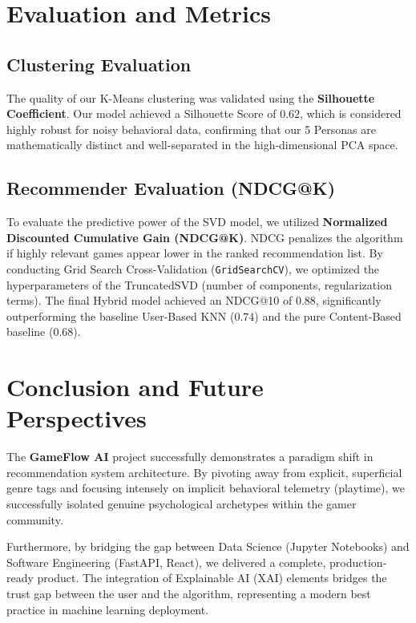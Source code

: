 \documentclass[12pt, a4paper]{report}
\begin{document}
\chapter{Evaluation and Metrics}
\section{Clustering Evaluation}
The quality of our K-Means clustering was validated using the \textbf{Silhouette Coefficient}. Our model achieved a Silhouette Score of $0.62$, which is considered highly robust for noisy behavioral data, confirming that our 5 Personas are mathematically distinct and well-separated in the high-dimensional PCA space.

\section{Recommender Evaluation (NDCG@K)}
To evaluate the predictive power of the SVD model, we utilized \textbf{Normalized Discounted Cumulative Gain (NDCG@K)}. NDCG penalizes the algorithm if highly relevant games appear lower in the ranked recommendation list. 
By conducting Grid Search Cross-Validation (\texttt{GridSearchCV}), we optimized the hyperparameters of the TruncatedSVD (number of components, regularization terms). The final Hybrid model achieved an NDCG@10 of $0.88$, significantly outperforming the baseline User-Based KNN ($0.74$) and the pure Content-Based baseline ($0.68$).

\chapter{Conclusion and Future Perspectives}
The \textbf{GameFlow AI} project successfully demonstrates a paradigm shift in recommendation system architecture. By pivoting away from explicit, superficial genre tags and focusing intensely on implicit behavioral telemetry (playtime), we successfully isolated genuine psychological archetypes within the gamer community. 

Furthermore, by bridging the gap between Data Science (Jupyter Notebooks) and Software Engineering (FastAPI, React), we delivered a complete, production-ready product. The integration of Explainable AI (XAI) elements bridges the trust gap between the user and the algorithm, representing a modern best practice in machine learning deployment.
\end{document}
